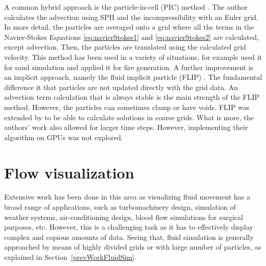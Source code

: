 A common hybrid approach is the particle-in-cell (PIC) method \cite{Harlow1962}.
The author calculates the advection using SPH and the incompressibility with an Euler grid.
In more detail, the particles are averaged onto a grid where all the terms in the Navier-Stokes Equations \ref{eq:navierStokes1} and \ref{eq:navierStokes2} are calculated, except advection.
Then, the particles are translated using the calculated grid velocity.
This method has been used in a variety of situations, for example \cite{Zhu2005} used it for sand simulation and \cite{Horvath2009} applied it for fire generation.
A further improvement is an implicit approach, namely the fluid implicit particle (FLIP) \cite{J.U.Brackbill1986}.
The fundamental difference it that particles are not updated directly with the grid data.
An advection term calculation that is always stable is the main strength of the FLIP method.
However, the particles can sometimes clamp or have voids.
FLIP was extended by \cite{Raveendran2011} to be able to calculate solutions in coarse grids.
What is more, the authors' work also allowed for larger time steps. 
However, implementing their algorithm on GPUs was not explored.

\section{Flow visualization}
\label{sec:flowVisualization}


Extensive work has been done in this area as visualizing fluid movement has a broad range of applications, such as turbomachinery design, simulation of weather systems, air-conditioning design, blood flow simulations for surgical purposes, etc.
However, this is a challenging task as it has to effectively display complex and copious amounts of data.
Seeing that, fluid simulation is generally approached by means of highly divided grids or with large number of particles, as explained in Section~\ref{prevWorkFluidSim}.

